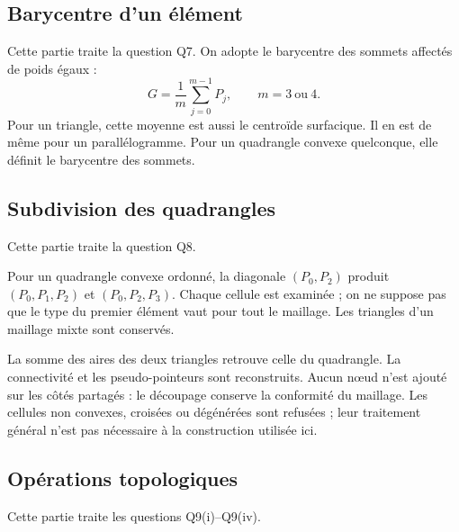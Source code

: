 \documentclass[12pt,a4paper]{article}
\begin{document}
\subsection{Barycentre d'un élément}
Cette partie traite la question Q7. On adopte le barycentre des sommets affectés de poids égaux :
\begin{equation*}
G=\frac1m\sum_{j=0}^{m-1}P_j,\qquad m=3\ \text{ou}\ 4.
\end{equation*}
Pour un triangle, cette moyenne est aussi le centroïde surfacique. Il en est de même pour un parallélogramme. Pour un quadrangle convexe quelconque, elle définit le barycentre des sommets.

\subsection{Subdivision des quadrangles}
Cette partie traite la question Q8.

Pour un quadrangle convexe ordonné, la diagonale $(P_0,P_2)$ produit $(P_0,P_1,P_2)$ et $(P_0,P_2,P_3)$. Chaque cellule est examinée ; on ne suppose pas que le type du premier élément vaut pour tout le maillage. Les triangles d'un maillage mixte sont conservés.

La somme des aires des deux triangles retrouve celle du quadrangle. La connectivité et les pseudo-pointeurs sont reconstruits. Aucun nœud n'est ajouté sur les côtés partagés : le découpage conserve la conformité du maillage. Les cellules non convexes, croisées ou dégénérées sont refusées ; leur traitement général n'est pas nécessaire à la construction utilisée ici.

\subsection{Opérations topologiques}
Cette partie traite les questions Q9(i)--Q9(iv).
\end{document}
